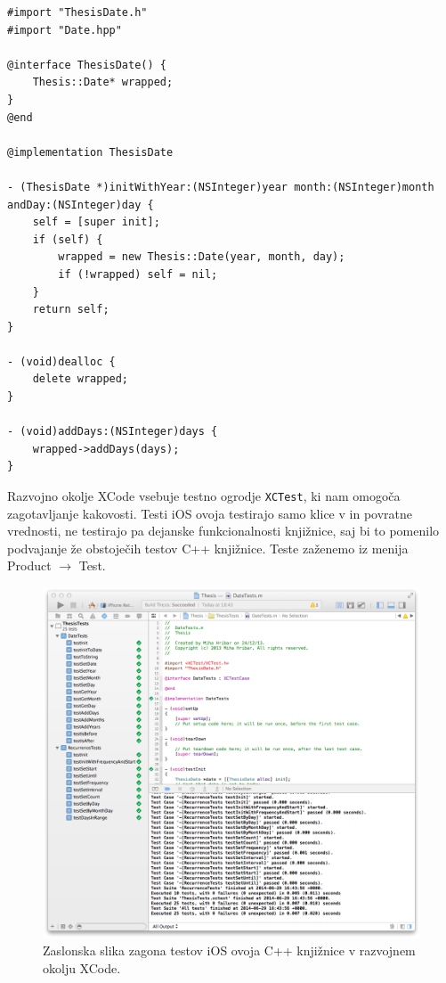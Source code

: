 \lstset{language=[Objective]C, breaklines}
\begin{lstlisting}[caption={Primer Objective-C++ ovoja C++ razreda \texttt{Date}.}, label=code:ios-wrapper]
#import "ThesisDate.h"
#import "Date.hpp"

@interface ThesisDate() {
    Thesis::Date* wrapped;
}
@end

@implementation ThesisDate

- (ThesisDate *)initWithYear:(NSInteger)year month:(NSInteger)month andDay:(NSInteger)day {
    self = [super init];
    if (self) {
        wrapped = new Thesis::Date(year, month, day);
        if (!wrapped) self = nil;
    }
    return self;
}

- (void)dealloc {
    delete wrapped;
}

- (void)addDays:(NSInteger)days {
    wrapped->addDays(days);
}
\end{lstlisting}

Razvojno okolje XCode vsebuje testno ogrodje \texttt{XCTest}, ki nam omogoča zagotavljanje kakovosti. Testi iOS ovoja testirajo samo klice v in povratne vrednosti, ne testirajo pa dejanske funkcionalnosti knjižnice, saj bi to pomenilo podvajanje že obstoječih testov C++ knjižnice. Teste zaženemo iz menija Product $\rightarrow$ Test.

\begin{figure}
 \includegraphics[width=\linewidth]{xcode-tests}
 \caption{Zaslonska slika zagona testov iOS ovoja C++ knjižnice v razvojnem okolju XCode.}
 \label{fig:xcode-tests}
\end{figure}

